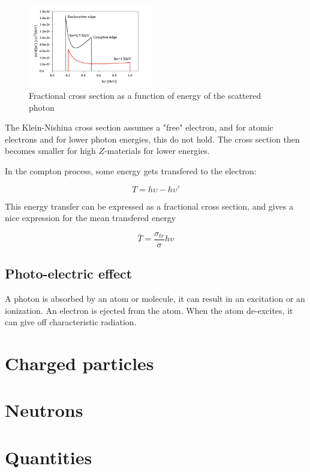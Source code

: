 \documentclass{article}
\begin{document}
\begin{figure}
    \centering
    \includegraphics[width = 0.48\textwidth]{photons/figs/kleinnishinaenergy}
    \caption{Fractional cross section as a function of energy of the scattered photon}
\end{figure}

The Klein-Nishina cross section assumes a "free" electron, and for atomic electrons and for lower photon energies, this do not hold.
The cross section then becomes smaller for high $Z$-materials for lower energies.

In the compton process, some energy gets transfered to the electron:

\begin{equation}
    T = h\upsilon - h \upsilon'
\end{equation}

This energy transfer can be expressed as a fractional cross section, and gives a nice expression for the mean transfered energy

\begin{equation}
    \bar{T} = \frac{\sigma_{tr}}{\sigma} h \upsilon
\end{equation}

\subsection{Photo-electric effect}

A photon is absorbed by an atom or molecule, it can result in an excitation or an ionization.
An electron is ejected from the atom.
When the atom de-excites, it can give off characteristic radiation.


\section{Charged particles}

\section{Neutrons}

\section{Quantities}
\end{document}
